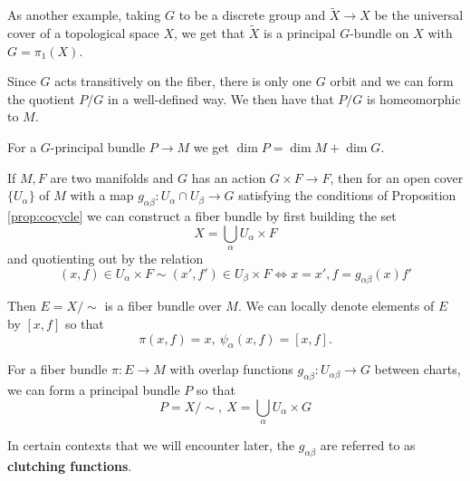		\begin{eg}
			As another example, taking $G$ to be a discrete group and $\tilde X \to X$ be the universal cover of a topological space $X$, we get that $\tilde X$ is a principal $G$-bundle on $X$ with $G=\pi_1(X)$.
		\end{eg}
		
		Since $G$ acts transitively on the fiber, there is only one $G$ orbit and we can form the quotient $P/G$ in a well-defined way. We then have that $P/G$ is homeomorphic to $M$.
		\begin{cor}
			For a $G$-principal bundle $P \to M$ we get $\dim P = \dim M + \dim G$.
		\end{cor}
		
		If $M,F$ are two manifolds and $G$ has an action $G \times F \rightarrow F$, then for an open cover $\{ U_\alpha \}$ of $M$ with a map $g_{\alpha \beta}: U_{\alpha}\cap U_{\beta} \to G$ satisfying the conditions of Proposition \ref{prop:cocycle} we can construct a fiber bundle by first building the set
		\begin{equation}
			X = \bigcup_\alpha U_\alpha \times F
		\end{equation} 
		and quotienting out by the relation
		\begin{equation}
			(x, f) \in U_\alpha \times F \sim (x', f') \in U_\beta \times F \Longleftrightarrow x=x', f=g_{\alpha \beta}(x) f' 
		\end{equation}
		
		Then $E = X/\sim$ is a fiber bundle over $M$. We can locally denote elements of $E$ by $[x,f]$ so that
		\begin{equation}
			\pi(x,f) = x, ~ \psi_\alpha(x,f) = [x,f].
		\end{equation}
		
		\begin{prop}
			For a fiber bundle $\pi: E \rightarrow M$ with overlap functions $g_{\alpha \beta}: U_{\alpha \beta} \rightarrow G$ between charts, we can form a principal bundle $P$ so that 
			\begin{equation}
				P = X/\sim, ~ X = \bigcup_\alpha U_\alpha \times G
			\end{equation}
		\end{prop}
		In certain contexts that we will encounter later, the $g_{\alpha \beta}$ are referred to as \textbf{clutching functions}.		%
		
